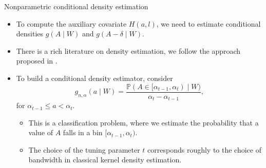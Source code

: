 \documentclass{beamer}
\newcommand{\pr}{\mathbb{P}}
\begin{document}

\begin{frame}[c]{Nonparametric conditional density estimation}

\begin{center}
\begin{itemize}
  \itemsep8pt
  \item To compute the auxiliary covariate $H(a,l)$, we need to estimate
    conditional densities $g(A \mid W)$ and $g(A - \delta \mid W)$.
  \item There is a rich literature on density estimation, we follow the approach
    proposed in \cite{diaz2011super}.
  \item To build a conditional density estimator, consider
    \begin{equation*}
      g_{n, \alpha}(a \mid W) = \frac{\pr (A \in [\alpha_{t-1}, \alpha_t)
        \mid W)}{\alpha_t - \alpha_{t-1}},
    \end{equation*}
    for $\alpha_{t-1} \leq a < \alpha_t$.
    \vspace{0.5em}
    \begin{itemize}
      \itemsep4pt
      \item This is a classification problem, where we estimate the probability
        that a value of $A$ falls in a bin $[\alpha_{t-1}, \alpha_t)$.
      \item The choice of the tuning parameter $t$ corresponds roughly to the
        choice of bandwidth in classical kernel density estimation.
    \end{itemize}
\end{itemize}
\end{center}

\note{
}

\end{frame}

\end{document}
